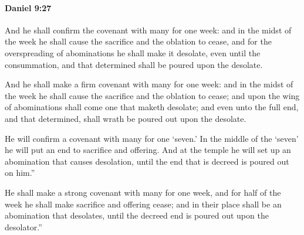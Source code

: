 		\paragraph{Daniel 9:27} %
			\label{DANIEL-9-27}

			And he shall confirm the covenant with many for one week: and in the midst of the week he shall cause the sacrifice and the oblation to cease, and for the overspreading of abominations he shall make it desolate, even until the consummation, and that determined shall be poured upon the desolate.

			\begin{versebox}
					\item[BHS] 
					\item[LXX] 
					\item[ASV] And he shall make a firm covenant with many for one week: and in the midst of the week he shall cause the sacrifice and the oblation to cease; and upon the wing of abominations shall come one that maketh desolate; and even unto the full end, and that determined, shall wrath be poured out upon the desolate.
					\item[NIV] He will confirm a covenant with many for one ‘seven.’ In the middle of the ‘seven’ he will put an end to sacrifice and offering. And at the temple he will set up an abomination that causes desolation, until the end that is decreed is poured out on him.”
					\item[NRSV] He shall make a strong covenant with many for one week, and for half of the week he shall make sacrifice and offering cease; and in their place shall be an abomination that desolates, until the decreed end is poured out upon the desolator.”
			\end{versebox}
